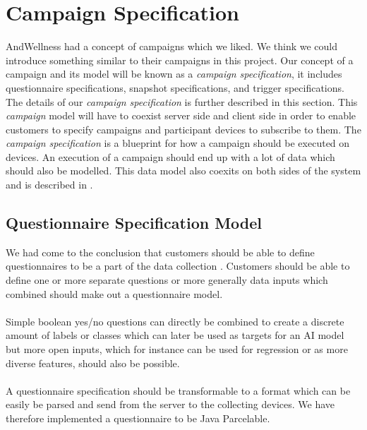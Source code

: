 
\section{Campaign Specification}
\label{sec:campaign_specification}
AndWellness had a concept of campaigns  which we liked. We think we could introduce something similar to their campaigns in this project. Our concept of a campaign and its model will be known as a \textit{campaign specification}, it includes questionnaire specifications, snapshot specifications, and trigger specifications. The details of our \textit{campaign specification} is further described in this section. This \textit{campaign} model will have to coexist server side and client side in order to enable customers to specify campaigns and participant devices to subscribe to them. The \textit{campaign specification} is a blueprint for how a campaign should be executed on devices. An execution of a campaign should end up with a lot of data which should also be modelled. This data model also coexits on both sides of the system and is described in .

\subsection{Questionnaire Specification Model}
\label{sub:questionnaire_model}
We had come to the conclusion that customers should be able to define questionnaires to be a part of the data collection . Customers should be able to define one or more separate questions or more generally data inputs which combined should make out a questionnaire model. 
\\\\
Simple boolean yes/no questions can directly be combined to create a discrete amount of labels or classes which can later be used as targets for an AI model but more open inputs, which for instance can be used for regression or as more diverse features, should also be possible. 
\\\\
A questionnaire specification should be transformable to a format which can be easily be parsed and send from the server to the collecting devices. We have therefore implemented a questionnaire to be Java Parcelable. 

